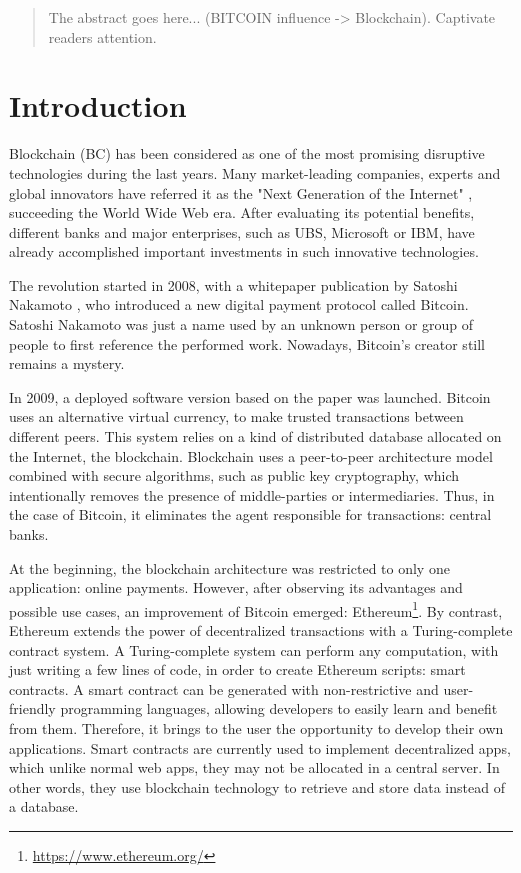 \begin{abstract}
 The abstract goes here... (BITCOIN influence -> Blockchain). Captivate readers attention.
\end{abstract}




\chapter{Introduction}

Blockchain (BC) has been considered as one of the most promising disruptive technologies during the last years. Many market-leading companies, experts and global innovators have referred it as the "Next Generation of the Internet" \cite{JenClarck2017}, succeeding the World Wide Web era. After evaluating its potential benefits, different banks and major enterprises, such as UBS, Microsoft or IBM, have already accomplished important investments in such innovative technologies.

The revolution started in 2008, with a whitepaper publication by Satoshi Nakamoto \cite{nakamoto2008bitcoin}, who introduced a new digital payment protocol called Bitcoin. Satoshi Nakamoto was just a name used by an unknown person or group of people to first reference the performed work. Nowadays, Bitcoin's creator still remains a mystery.

In 2009, a deployed software version based on the paper was launched. Bitcoin uses an alternative virtual currency, to make trusted transactions between different peers. This system relies on a kind of distributed database allocated on the Internet, the blockchain. Blockchain uses a peer-to-peer architecture model combined with secure algorithms, such as public key cryptography, which intentionally removes the presence of middle-parties or intermediaries. Thus, in the case of Bitcoin, it eliminates the agent responsible for transactions: central banks.

At the beginning, the blockchain architecture was restricted to only one application: online payments. However, after observing its advantages and possible use cases, an improvement of Bitcoin emerged: Ethereum\footnote{\url{https://www.ethereum.org/}}. By contrast, Ethereum extends the power of decentralized transactions with a Turing-complete contract system. A Turing-complete system can perform any computation, with just writing a few lines of code, in order to create Ethereum scripts: smart contracts. A smart contract can be generated with non-restrictive and user-friendly programming languages, allowing developers to easily learn and benefit from them. Therefore, it brings to the user the opportunity to develop their own applications. Smart contracts are currently used to implement decentralized apps, which unlike normal web apps, they may not be allocated in a central server. In other words, they use blockchain technology to retrieve and store data instead of a database.


